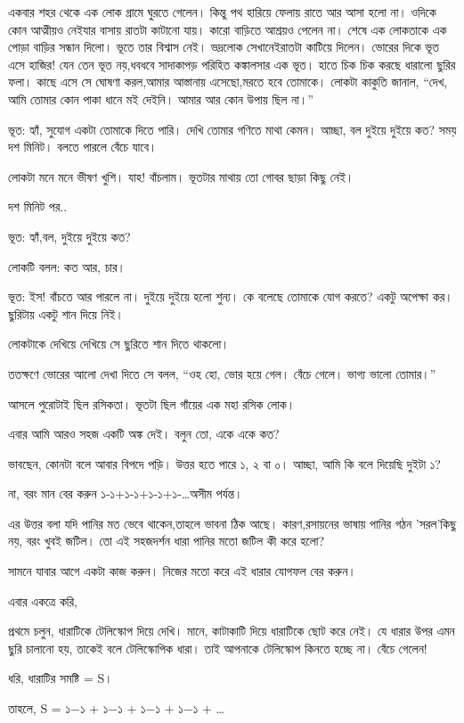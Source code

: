 \documentclass[
]{book}
\begin{document}
একবার শহর থেকে এক লোক গ্রামে ঘুরতে গেলেন। কিন্তু পথ হারিয়ে ফেলায় রাতে আর আসা হলো না। ওদিকে কোন আত্মীয়ও নেইযার বাসায় রাতটা কাটানো যায়। কারো বাড়িতে আশ্রয়ও পেলেন না। শেষে এক লোকতাকে এক পোড়া বাড়ির সন্ধান দিলো। ভূতে তার বিশ্বাস নেই। ভদ্রলোক সেখানেইরাতটা কাটিয়ে দিলেন। ভোরের দিকে ভূত এসে হাজির! যেন তেন ভূত নয়,ধবধবে সাদাকাপড় পরিহিত কঙ্কালসার এক ভূত। হাতে চিক চিক করছে ধারালো ছুরির ফলা। কাছে এসে সে ঘোষণা করল,আমার আস্তানায় এসেছো,মরতে হবে তোমাকে। লোকটা কাকুতি জানাল, ``দেখ, আমি তোমার কোন পাকা ধানে মই দেইনি। আমার আর কোন উপায় ছিল না।''

ভূত: হ্যাঁ, সুযোগ একটা তোমাকে দিতে পারি। দেখি তোমার গণিতে মাথা কেমন। আচ্ছা, বল দুইয়ে দুইয়ে কত? সময় দশ মিনিট। বলতে পারলে বেঁচে যাবে।

লোকটা মনে মনে ভীষণ খুশি। যাহ! বাঁচলাম। ভূতটার মাথায় তো গোবর ছাড়া কিছু নেই।

দশ মিনিট পর..

ভূত: হ্যাঁ,বল, দুইয়ে দুইয়ে কত?

লোকটি বলল: কত আর, চার।

ভূত: ইস! বাঁচতে আর পারলে না। দুইয়ে দুইয়ে হলো শুন্য। কে বলেছে তোমাকে যোগ করতে? একটু অপেক্ষা কর। ছুরিটায় একটু শান দিয়ে নিই।

লোকটাকে দেখিয়ে দেখিয়ে সে ছুরিতে শান দিতে থাকলো।

ততক্ষণে ভোরের আলো দেখা দিতে সে বলল, ``ওহ হো, ভোর হয়ে গেল। বেঁচে গেলে। ভাগ্য ভালো তোমার।''

আসলে পুরোটাই ছিল রসিকতা। ভূতটা ছিল গাঁয়ের এক মহা রসিক লোক।

এবার আমি আরও সহজ একটি অঙ্ক দেই। বলুন তো, একে একে কত?

ভাবছেন, কোনটা বলে আবার বিপদে পড়ি। উত্তর হতে পারে ১, ২ বা ০। আচ্ছা, আমি কি বলে দিয়েছি দুইটা ১?

না, বরং মান বের করুন ১-১+১-১+১-১+১-\ldots অসীম পর্যন্ত।

এর উত্তর বলা যদি পানির মত ভেবে থাকেন,তাহলে ভাবনা ঠিক আছে। কারণ,রসায়নের ভাষায় পানির গঠন 'সরল'কিছু নয়, বরং খুবই জটিল। তো এই সহজদর্শন ধারা পানির মতো জটিল কী করে হলো?

সামনে যাবার আগে একটা কাজ করুন। নিজের মতো করে এই ধারার যোগফল বের করুন।

এবার একত্রে করি,

প্রথমে চলুন, ধারাটিকে টেলিস্কোপ দিয়ে দেখি। মানে, কাটাকাটি দিয়ে ধারাটিকে ছোট করে নেই। যে ধারার উপর এমন ছুরি চালানো হয়, তাকেই বলে টেলিস্কোপিক ধারা। তাই আপনাকে টেলিস্কোপ কিনতে হচ্ছে না। বেঁচে গেলেন!

ধরি, ধারাটির সমষ্টি = S।

তাহলে, S = ১−১ + ১−১ + ১−১ + ১−১ + \ldots{}
\end{document}
